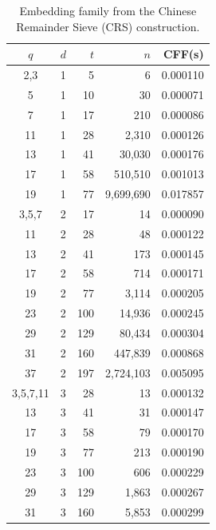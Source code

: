 \begin{table}[htbp]
  \centering
  \begin{tabular}{ccrrr}
  \toprule
  $q$ & $d$ & $t$ & $n$ & \textbf{CFF(s)} \\
  \midrule
  2{,}3 & 1 & 5 & 6 & 0.000110 \\
  5 & 1 & 10 & 30 & 0.000071 \\
  7 & 1 & 17 & 210 & 0.000086 \\
  11 & 1 & 28 & 2{,}310 & 0.000126 \\
  13 & 1 & 41 & 30{,}030 & 0.000176 \\
  17 & 1 & 58 & 510{,}510 & 0.001013 \\
  19 & 1 & 77 & 9{,}699{,}690 & 0.017857 \\
  \addlinespace
  2{,}3{,}5{,}7 & 2 & 17 & 14 & 0.000090 \\
  11 & 2 & 28 & 48 & 0.000122 \\
  13 & 2 & 41 & 173 & 0.000145 \\
  17 & 2 & 58 & 714 & 0.000171 \\
  19 & 2 & 77 & 3{,}114 & 0.000205 \\
  23 & 2 & 100 & 14{,}936 & 0.000245 \\
  29 & 2 & 129 & 80{,}434 & 0.000304 \\
  31 & 2 & 160 & 447{,}839 & 0.000868 \\
  37 & 2 & 197 & 2{,}724{,}103 & 0.005095 \\
  \addlinespace
  2{,}3{,}5{,}7{,}11 & 3 & 28 & 13 & 0.000132 \\
  13 & 3 & 41 & 31 & 0.000147 \\
  17 & 3 & 58 & 79 & 0.000170 \\
  19 & 3 & 77 & 213 & 0.000190 \\
  23 & 3 & 100 & 606 & 0.000229 \\
  29 & 3 & 129 & 1{,}863 & 0.000267 \\
  31 & 3 & 160 & 5{,}853 & 0.000299 \\
  \bottomrule
  \end{tabular}
  \caption{Embedding family from the Chinese Remainder Sieve (CRS) construction.}
  \label{tab:crs-embedding}
\end{table}
